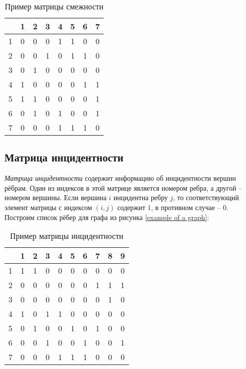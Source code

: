 \begin{table}[h]
	\center
	\begin{tabular}{|c|ccccccc|}
		\hline
		\space & 1 & 2 & 3 & 4 & 5 & 6 & 7\\
		\hline
		1 & 0 & 0 & 0 & 1 & 1 & 0 & 0\\
		2 & 0 & 0 & 1 & 0 & 1 & 1 & 0\\
		3 & 0 & 1 & 0 & 0 & 0 & 0 & 0\\
		4 & 1 & 0 & 0 & 0 & 0 & 1 & 1\\
		5 & 1 & 1 & 0 & 0 & 0 & 0 & 1\\
		6 & 0 & 1 & 0 & 1 & 0 & 0 & 1\\
		7 & 0 & 0 & 0 & 1 & 1 & 1 & 0\\
		\hline
	\end{tabular}
	\caption{Пример матрицы смежности}
\end{table}

\subsection{Матрица инцидентности}

\emph{Матрица инцидентности} содержит информацию об инцидентности вершин 
рёбрам. Один из индексов в этой матрице является номером ребра, а другой – 
номером вершины. Если вершина $i$ инцидентна ребру $j$, то соответствующий 
элемент матрицы с индексом $(i,j)$ содержит $1$, в противном случае – $0$. 
Построим список рёбер для графа из рисунка \ref{example of a graph}:

\begin{table}[h]
	\center
	\begin{tabular}{|c|c|c|c|c|c|c|c|c|c|}
		\hline
		\space & 1 & 2 & 3 & 4 & 5 & 6 & 7 & 8 & 9\\
		\hline
		1 & 1 & 1 & 0 & 0 & 0 & 0 & 0 & 0 & 0\\
		2 & 0 & 0 & 0 & 0 & 0 & 0 & 1 & 1 & 1\\
		3 & 0 & 0 & 0 & 0 & 0 & 0 & 0 & 1 & 0\\
		4 & 1 & 0 & 1 & 1 & 0 & 0 & 0 & 0 & 0\\
		5 & 0 & 1 & 0 & 0 & 1 & 0 & 1 & 0 & 0\\
		6 & 0 & 0 & 1 & 0 & 0 & 1 & 0 & 0 & 1\\
		7 & 0 & 0 & 0 & 1 & 1 & 1 & 0 & 0 & 0\\
		\hline
	\end{tabular}
	\caption{Пример матрицы инцидентности}
\end{table}

